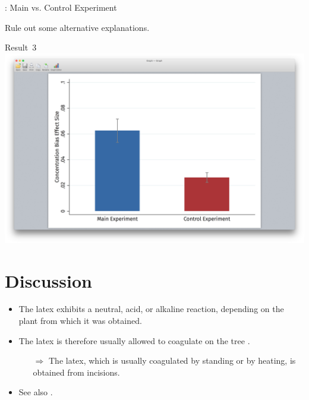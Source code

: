 \begin{frame}{\titleprefix: Main vs. Control Experiment}

	Rule out some alternative explanations.
	
	\bigskip
	
	\centering
	{\small \alert{Result~3}} \\[15pt]
	\includegraphics[height=0.5\textheight, trim={3.75in 1.75in 3.75in 2in}, clip]
		{1_Example_Content/Images/average_main_control.png}

\end{frame}


\section{Discussion}


\begin{frame}{\titleprefix}

	\begin{itemize}
		\item The latex exhibits a neutral, acid, or alkaline reaction, depending on the plant from which it was obtained.
		\item The latex is therefore usually allowed to coagulate on the tree \citep{Koszegi2013}.
			\begin{itemize}
				\item[$\Rightarrow$] The latex, which is usually coagulated by standing or by heating, is obtained from incisions.
			\end{itemize}
		\item See also \cite{Bordalo2013}.
	\end{itemize}	

\end{frame}


